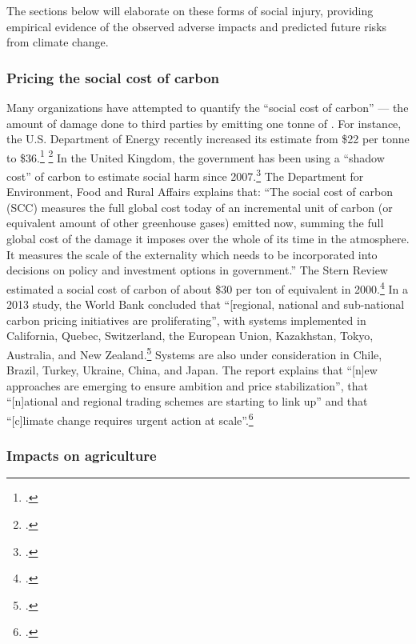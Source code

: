 The sections below will elaborate on these forms of social injury, providing empirical evidence of the observed adverse impacts and predicted future risks from climate change.


	\subsubsection{Pricing the social cost of carbon}
	\label{sec:PricingSocialCost}



Many organizations have attempted to quantify the ``social cost of carbon'' --- the amount of damage done to third parties by emitting one tonne of .
For instance, the U.S. Department of Energy recently increased its estimate from \$22 per tonne to \$36.\footcite[][]{DOE22to36} \footcite[][]{WHStrengthened}
In the United Kingdom, the government has been using a ``shadow cost'' of carbon to estimate social harm since 2007.\footcite[][]{DEFRAShadowCost}
The Department for Environment, Food and Rural Affairs explains that: ``The social cost of carbon (SCC) measures the full global cost today of an incremental unit of carbon (or equivalent amount of other greenhouse gases) emitted now, summing the full global cost of the damage it imposes over the whole of its time in the atmosphere. It measures the scale of the externality which needs to be incorporated into decisions on policy and investment options in government.''
The Stern Review estimated a social cost of carbon of about \$30 per ton of  equivalent in 2000.\footcite[][]{Stern2007}
In a 2013 study, the World Bank concluded that ``[regional, national and sub-national carbon pricing initiatives are proliferating'', with systems implemented in California, Quebec, Switzerland, the European Union, Kazakhstan, Tokyo, Australia, and New Zealand.\footcite[][p. 11]{WorldBankCarbonPricing}
Systems are also under consideration in Chile, Brazil, Turkey, Ukraine, China, and Japan.
The report explains that ``[n]ew approaches are emerging to ensure ambition and price stabilization'', that ``[n]ational and regional trading schemes are starting to link up'' and that ``[c]limate change requires urgent action at scale''.\footcite[][p. 12--13]{WorldBankCarbonPricing}



	\subsubsection{Impacts on agriculture}



